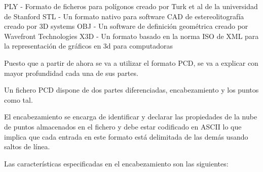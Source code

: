 PLY - Formato de ficheros para polígonos creado por Turk et al de la universidad de Stanford
STL - Un formato nativo para software CAD de estereolitografía creado por 3D systems 
OBJ - Un software de definición geométrica creado por Wavefront Technologies 
X3D - Un formato basado en la norma ISO de XML para la representación de gráficos en 3d para computadoras 

Puesto que a partir de ahora se va a utilizar el formato PCD, se va a explicar con mayor profundidad cada una de sus partes.

Un fichero PCD dispone de dos partes diferenciadas, encabezamiento y los puntos como tal.

El encabezamiento se encarga de identificar y declarar las propiedades de la nube de puntos almacenados en el fichero y debe estar codificado en ASCII lo que implica que cada entrada en este formato está delimitada de las demás usando saltos de línea.

Las características especificadas en el encabezamiento son las siguientes:

